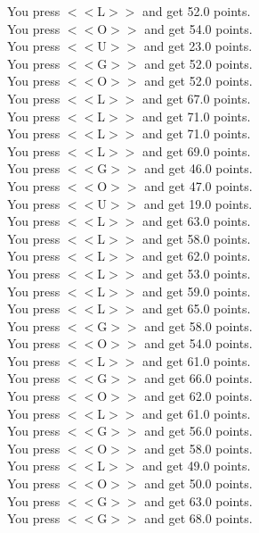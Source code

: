 \documentclass[pdflatex,sn-nature]{sn-jnl}%
\theoremstyle{thmstyleone}%
\theoremstyle{thmstyletwo}%
\theoremstyle{thmstylethree}%
\begin{document}
You press $<<$L$>>$ and get 52.0 points. $~$\\ 
You press $<<$O$>>$ and get 54.0 points. $~$\\ 
You press $<<$U$>>$ and get 23.0 points. $~$\\ 
You press $<<$G$>>$ and get 52.0 points. $~$\\ 
You press $<<$O$>>$ and get 52.0 points. $~$\\ 
You press $<<$L$>>$ and get 67.0 points. $~$\\ 
You press $<<$L$>>$ and get 71.0 points. $~$\\ 
You press $<<$L$>>$ and get 71.0 points. $~$\\ 
You press $<<$L$>>$ and get 69.0 points. $~$\\ 
You press $<<$G$>>$ and get 46.0 points. $~$\\ 
You press $<<$O$>>$ and get 47.0 points. $~$\\ 
You press $<<$U$>>$ and get 19.0 points. $~$\\ 
You press $<<$L$>>$ and get 63.0 points. $~$\\ 
You press $<<$L$>>$ and get 58.0 points. $~$\\ 
You press $<<$L$>>$ and get 62.0 points. $~$\\ 
You press $<<$L$>>$ and get 53.0 points. $~$\\ 
You press $<<$L$>>$ and get 59.0 points. $~$\\ 
You press $<<$L$>>$ and get 65.0 points. $~$\\ 
You press $<<$G$>>$ and get 58.0 points. $~$\\ 
You press $<<$O$>>$ and get 54.0 points. $~$\\ 
You press $<<$L$>>$ and get 61.0 points. $~$\\ 
You press $<<$G$>>$ and get 66.0 points. $~$\\ 
You press $<<$O$>>$ and get 62.0 points. $~$\\ 
You press $<<$L$>>$ and get 61.0 points. $~$\\ 
You press $<<$G$>>$ and get 56.0 points. $~$\\ 
You press $<<$O$>>$ and get 58.0 points. $~$\\ 
You press $<<$L$>>$ and get 49.0 points. $~$\\ 
You press $<<$O$>>$ and get 50.0 points. $~$\\ 
You press $<<$G$>>$ and get 63.0 points. $~$\\ 
You press $<<$G$>>$ and get 68.0 points. $~$\\ 
\end{document}
